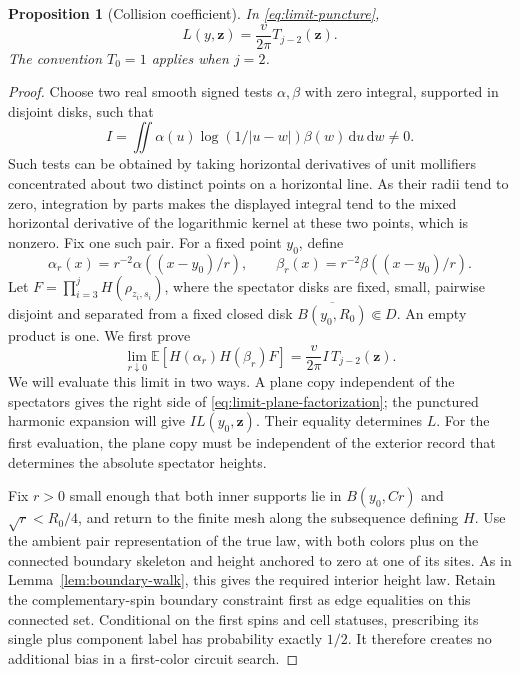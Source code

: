 \documentclass[11pt]{article}
\newtheorem{proposition}[theorem]{Proposition}
\theoremstyle{definition}
\theoremstyle{remark}
\numberwithin{equation}{section}
\begin{document}
\begin{proposition}[Collision coefficient]
\label{prop:collision}
In \eqref{eq:limit-puncture},
\begin{equation}
              L(y,\mathbf z)=\frac{v}{2\pi}T_{j-2}(\mathbf z).
 \label{eq:limit-collision}
\end{equation}
The convention \(T_0=1\) applies when \(j=2\).
\end{proposition}

\begin{proof}
Choose two real smooth signed tests \(\alpha,\beta\) with zero
integral, supported in disjoint disks, such that
\[
 I=\iint\alpha(u)\log(1/|u-w|)\beta(w)\,\mathrm d u\,\mathrm d w\ne0.
\]
Such tests can be obtained by taking horizontal derivatives of
unit mollifiers concentrated about two distinct points on a
horizontal line.  As their radii tend to zero, integration by parts
makes the displayed integral tend to the mixed horizontal derivative
of the logarithmic kernel at these two points, which is nonzero.
Fix one such pair.  For a fixed point \(y_0\), define
\[
 \alpha_r(x)=r^{-2}\alpha((x-y_0)/r),\qquad
 \beta_r(x)=r^{-2}\beta((x-y_0)/r).
\]
Let \(F=\prod_{i=3}^jH(\rho_{z_i,s_i})\), where the spectator disks
are fixed, small, pairwise disjoint and separated from a fixed
closed disk \(\overline{B(y_0,R_0)}\Subset D\).
An empty product is one.  We first prove
\begin{equation}
 \lim_{r\downarrow0}
       \mathbb E[H(\alpha_r)H(\beta_r)F]
          =\frac{v}{2\pi}I\,T_{j-2}(\mathbf z).
 \label{eq:limit-plane-factorization}
\end{equation}
We will evaluate this limit in two ways.  A plane copy independent of
the spectators gives the right side of
\eqref{eq:limit-plane-factorization}; the punctured harmonic expansion
will give \(I L(y_0,\mathbf z)\).  Their equality determines \(L\).
For the first evaluation, the plane copy must be independent of the
exterior record that determines the absolute spectator heights.

Fix \(r>0\) small enough that both inner supports lie in
\(B(y_0,Cr)\) and \(\sqrt r<R_0/4\), and return to the finite
mesh along the subsequence defining \(H\).
Use the ambient pair representation of the true law, with both
colors plus on the connected boundary skeleton and height anchored
to zero at one of its sites.  As in Lemma~\ref{lem:boundary-walk},
this gives the required interior height law.
Retain the complementary-spin boundary constraint first as edge
equalities on this connected set.  Conditional on the first spins
and cell statuses, prescribing its single plus component label has
probability exactly \(1/2\).  It therefore creates no additional
bias in a first-color circuit search.


\end{proof}
\end{document}
